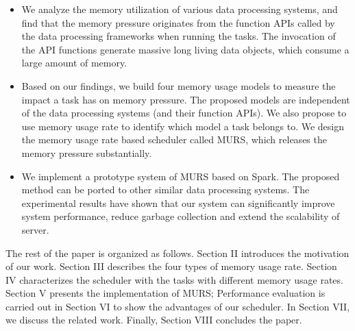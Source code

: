 \begin{itemize}

\item We analyze the memory utilization of various data processing systems, and find that the memory pressure originates from the function APIs called by the data processing frameworks when running the tasks. The invocation of the API functions generate massive long living data objects, which consume a large amount of memory.

\item Based on our findings, we build four memory usage models to measure the impact a task has on memory pressure. The proposed models are independent of the data processing systems (and their function APIs). We also propose to use memory usage rate to identify which model a task belongs to. We design the memory usage rate based scheduler called MURS, which releases the memory pressure substantially.


\item We implement a prototype system of MURS based on Spark. The proposed method can be ported to other similar data processing systems. The experimental results have shown that our system can significantly improve system performance, reduce garbage collection and extend the scalability of server.

\end{itemize}

The rest of the paper is organized as follows. Section II introduces the motivation of our work. Section III describes the four types of memory usage rate. Section IV characterizes the scheduler with the tasks with different memory usage rates. Section V presents the implementation of MURS; Performance evaluation is carried out in Section VI to show the advantages of our scheduler. In Section VII, we discuss the related work. Finally, Section VIII concludes the paper.